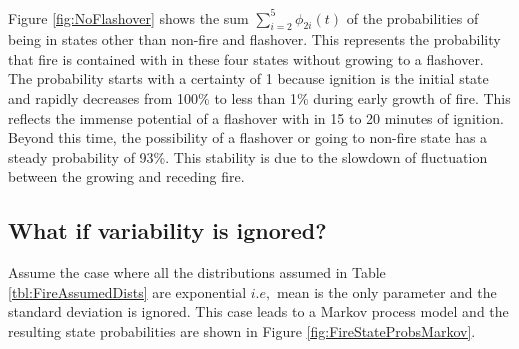 \documentclass[12pt]{asme2ej}
\begin{document}
Figure \ref{fig:NoFlashover} shows the sum $\sum_{i=2}^5 \phi_{2i}(t)$  of the probabilities of being in states other than non-fire and flashover. This represents the probability that fire is contained with in these four states without growing to a flashover. The probability starts with a certainty of 1 because ignition is the initial state and rapidly decreases from 100$\%$ to less than 1\% during early growth of fire. This reflects the immense potential of a flashover with in 15 to 20 minutes of ignition. Beyond this time, the possibility of a flashover or going to non-fire state has a steady probability of 93\%. This stability is due to the slowdown of fluctuation between the growing and receding fire. 

\subsection{What if variability is ignored?}

Assume the case where all the distributions assumed in Table \ref{tbl:FireAssumedDists} are exponential $i.e,$ mean is the only parameter and the standard deviation is ignored. This case leads to a Markov process model and the resulting state probabilities are shown in Figure \ref{fig:FireStateProbsMarkov}. 
\end{document}
